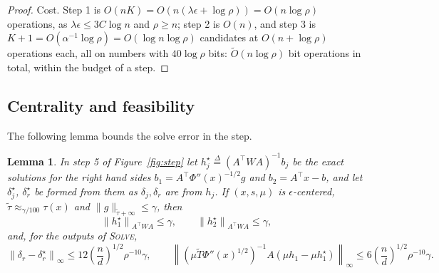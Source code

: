 \documentclass[11pt]{article}
\newtheorem{lemma}{Lemma}[section]
\renewcommand{\O}{\widetilde O}
\newcommand{\tautil}{\widetilde{\tau}}
\newcommand{\defeq}{\stackrel{\Delta}{=}}
\begin{document}
\begin{proof}
Cost.
Step 1 is $O(n K) = O(n (\lambda \epsilon + \log \rho)) = O(n \log \rho)$
operations, as $\lambda \epsilon \le 3 C \log n$ and
$\rho \ge n$; step 2 is
$O(n)$, and step 3 is
$K + 1 = O(\alpha^{-1} \log \rho) = O(\log n \log \rho)$ candidates at
$O(n + \log \rho)$ operations each, all on numbers with
$40 \log \rho$ bits:
$\O(n \log \rho)$ bit operations in total, within the budget of a step.
\end{proof}

\subsection{Centrality and feasibility}

The following lemma bounds the solve error in the step.

\begin{lemma}
\label{lem:solve_error}
In step 5 of Figure~\ref{fig:step} let
$h_j^{\star} \defeq (A^\top W A)^{-1} b_j$ be the exact solutions for the right
hand sides $b_1 = A^\top \Phi''(x)^{-1/2} g$ and
$b_2 = A^\top x - b$, and let
$\delta_j^{\star}$,
$\delta_r^{\star}$ be formed from them as
$\delta_j, \delta_r$ are from
$h_j$.
If $(x, s, \mu)$ is
$\epsilon$-centered,
$\tautil \approx_{\gamma / 100} \tau(x)$ and
$\|g\|_{\tautil + \infty} \le \gamma$, then
\[
\left\| h_1^{\star} \right\|_{A^\top W A} \le \gamma,
\qquad
\left\| h_2^{\star} \right\|_{A^\top W A} \le \gamma,
\]
and, for the outputs of \textsc{Solve},
\[
\left\| \delta_r - \delta_r^{\star} \right\|_{\infty}
\le
12 \left( \frac{n}{d} \right)^{1/2} \rho^{-10} \gamma,
\qquad
\left\| \left( \mu \widetilde{T} \Phi''(x)^{1/2} \right)^{-1}
A \left( \mu h_1 - \mu h_1^{\star} \right) \right\|_{\infty}
\le
6 \left( \frac{n}{d} \right)^{1/2} \rho^{-10} \gamma .
\]
\end{lemma}
\end{document}
